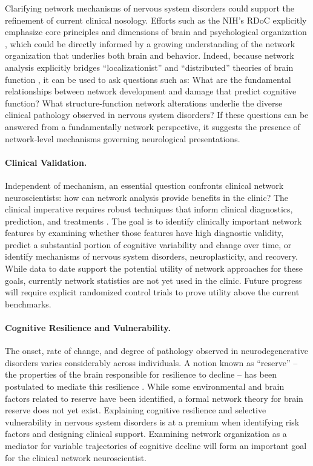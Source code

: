 \documentclass[12pt]{article}
\begin{document}
Clarifying network mechanisms of nervous system disorders could support the refinement of current clinical nosology. Efforts such as the NIH's RDoC explicitly emphasize core principles and dimensions of brain and psychological organization \cite{insel2009endophenotypes}, which could be directly informed by a growing understanding of the network organization that underlies both brain and behavior. Indeed, because network analysis explicitly bridges ``localizationist'' and ``distributed'' theories of brain function \cite{heilman2010clinical}, it can be used to ask questions such as: What are the fundamental relationships between network development and damage that predict cognitive function? What structure-function network alterations underlie the diverse clinical pathology observed in nervous system disorders? If these questions can be answered from a fundamentally network perspective, it suggests the presence of network-level mechanisms governing neurological presentations. 

\paragraph{Clinical Validation.}

Independent of mechanism, an essential question confronts clinical network neuroscientists: how can network analysis provide benefits in the clinic? The clinical imperative requires robust techniques that inform clinical diagnostics, prediction, and treatments \cite{ioannidis2016most}. The goal is to identify clinically important network features by examining whether those features have high diagnostic validity, predict a substantial portion of cognitive variability and change over time, or identify mechanisms of nervous system disorders, neuroplasticity, and recovery. While data to date support the potential utility of network approaches for these goals, currently network statistics are not yet used in the clinic. Future progress will require explicit randomized control trials to prove utility above the current benchmarks.

\paragraph{Cognitive Resilience and Vulnerability.}

The onset, rate of change, and degree of pathology observed in neurodegenerative disorders varies considerably across individuals. A notion known as ``reserve'' -- the properties of the brain responsible for resilience to decline -- has been postulated to mediate this resilience \cite{satz1993brain}. While some environmental and brain factors related to reserve have been identified, a formal network theory for brain reserve does not yet exist. Explaining cognitive resilience and selective vulnerability \cite{seeley2008selective} in nervous system disorders is at a premium when identifying risk factors and designing clinical support. Examining network organization as a mediator for variable trajectories of cognitive decline will form an important goal for the clinical network neuroscientist. 
\end{document}
